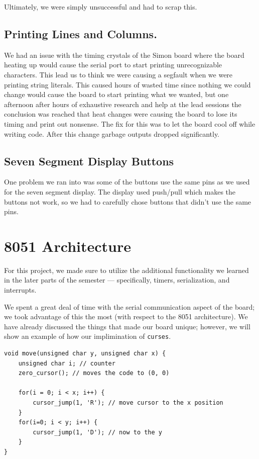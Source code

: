 \documentclass[12pt]{article}
\newcommand{\shellcmd}[1]{\texttt{\colorbox{gray!30}{#1}}}
\begin{document}
Ultimately, we were simply unsuccessful and had to scrap this.

\subsection{Printing Lines and Columns.}
We had an issue with the timing crystals of the Simon board where the board heating up would cause the serial port to start printing unrecognizable characters. This lead us to think we were causing a segfault when we were printing string literals. This caused hours of wasted time since nothing we could change would cause the board to start printing what we wanted, but one afternoon after hours of exhaustive research and help at the lead sessions the conclusion was reached that heat changes were causing the board to lose its timing and print out nonsense. The fix for this was to let the board cool off while writing code. After this change garbage outputs dropped significantly.

\subsection{Seven Segment Display Buttons}
One problem we ran into was some of the buttons use the same pins as we used for the seven segment display. The display used push/pull which makes the buttons not work, so we had to carefully chose buttons that didn't use the same pins.

\section{8051 Architecture}
For this project, we made sure to utilize the additional functionality we learned in the later parts of the semester --- specifically, timers, serialization, and interrupts.

We spent a great deal of time with the serial communication aspect of the board; we took advantage of this the most (with respect to the \num{8051} architecture). We have already discussed the things that made our board unique; however, we will show an example of how our implimination of \shellcmd{curses}.

\begin{lstlisting}[style=cC]
void move(unsigned char y, unsigned char x) {
	unsigned char i; // counter
	zero_cursor(); // moves the code to (0, 0)

	for(i = 0; i < x; i++) {
		cursor_jump(1, 'R'); // move cursor to the x position
	}
	for(i=0; i < y; i++) {
		cursor_jump(1, 'D'); // now to the y
	}
}
\end{lstlisting}
\end{document}
